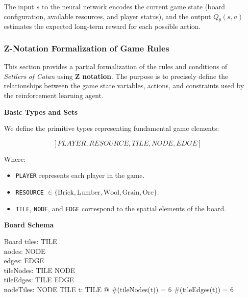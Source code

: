 \documentclass{article}
\begin{document}
The input $s$ to the neural network encodes the current game state (board configuration, available resources, and player status), and the output $Q_{\theta}(s, a)$ estimates the expected long-term reward for each possible action.

\subsubsection{Z-Notation Formalization of Game Rules}
\label{sec:math-formalization}

This section provides a partial formalization of the rules and conditions of \textit{Settlers of Catan} using \textbf{Z notation}.
The purpose is to precisely define the relationships between the game state variables, actions, and constraints used by the reinforcement learning agent. \newline

\textbf{Basic Types and Sets}

We define the primitive types representing fundamental game elements:

\[
[PLAYER, RESOURCE, TILE, NODE, EDGE]
\]

Where:
\begin{itemize}
    \item \texttt{PLAYER} represents each player in the game.
    \item \texttt{RESOURCE} $\in \{\text{Brick}, \text{Lumber}, \text{Wool}, \text{Grain}, \text{Ore}\}$.
    \item \texttt{TILE}, \texttt{NODE}, and \texttt{EDGE} correspond to the spatial elements of the board. \newline
\end{itemize}

\textbf{Board Schema}

\begin{schema}{Board}
    tiles:  TILE \\
    nodes:  NODE \\
    edges:  EDGE \\
    tileNodes: TILE \fun {} NODE \\  %
    tileEdges: TILE \fun {} EDGE \\  %
    nodeTiles: NODE \fun {} TILE    %
\where
    \forall t: TILE @
        \#(tileNodes(t)) = 6 \land
        \#(tileEdges(t)) = 6
\end{schema}
\end{document}
